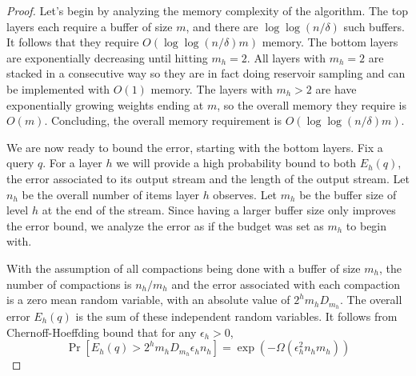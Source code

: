 \documentclass[12pt]{colt2019} %
\newcommand{\eps}{\epsilon}
\begin{document}
{\begin{proof}
Let's begin by analyzing the memory complexity of the algorithm. The top layers each require a buffer of size $m$, and there are $\log\log(n/\delta)$ such buffers. It follows that they require $O(\log\log(n/\delta)m)$ memory. The bottom layers are exponentially decreasing until hitting $m_h=2$. All layers with $m_h=2$ are stacked in a consecutive way so they are in fact doing reservoir sampling and can be implemented with $O(1)$ memory. The layers with $m_h>2$ are have exponentially growing weights ending at $m$, so the overall memory they require is $O(m)$. Concluding, the overall memory requirement is $O(\log\log(n/\delta)m)$.

We are now ready to bound the error, starting with the bottom layers. Fix a query $q$. For a layer $h$ we will provide a high probability bound to both $E_h(q)$, the error associated to its output stream and the length of the output stream. Let $n_h$ be the overall number of items layer $h$ observes. Let $m_h$ be the buffer size of level $h$ at the end of the stream. Since having a larger buffer size only improves the error bound, we analyze the error as if the budget was set as $m_h$ to begin with.

With the assumption of all compactions being done with a buffer of size $m_h$, the number of compactions is $n_h/m_h$ and the error associated with each compaction is a zero mean random variable, with an absolute value of $2^h m_h D_{m_h}$. The overall error $E_h(q)$ is the sum of these independent random variables. It follows from Chernoff-Hoeffding bound that for any $\eps_h > 0$,
\begin{equation} \label{eq:err low1}
\Pr\left[ E_h(q) > 2^h m_h D_{m_h} \eps_h n_h \right] = \exp \left( -\Omega\left( \eps_h^2 n_h m_h \right) \right)
\end{equation}


\end{proof}}
\end{document}
